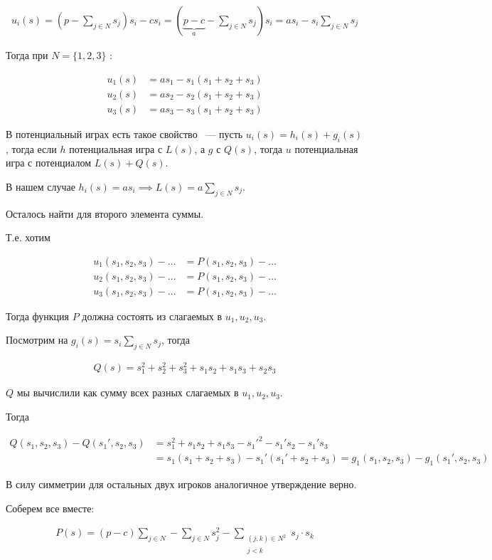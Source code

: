 
\begin{exmpl}
	\begin{align*}
		u_i(s) = (p - \sum_{j \in N}s_j) s_i - c s_i = (\underbrace{p - c}_{a} - \sum_{j \in N} s_j) s_i = a s_i - s_i \sum_{j \in N} s_j
	\end{align*}

	Тогда при $N = \{1, 2, 3\}$ :

	\begin{align*}
		u_1(s) &= as_1 - s_1(s_1 + s_2 + s_3) \\
		u_2(s) &= as_2 - s_2(s_1 + s_2 + s_3) \\
		u_3(s) &= as_3 - s_3(s_1 + s_2 + s_3)
	\end{align*}

	В потенциальный играх есть такое свойство ~--- пусть $u_i(s) = h_i(s) + g_i(s)$, тогда если  $h$ потенциальная игра с  $L(s)$, а  $g$ с  $Q(s)$, тогда  $u$ потенциальная игра с потенциалом  $L(s) + Q(s)$.

	В нашем случае $h_i(s) = a s_i \implies L(s) = a \sum_{j \in N} s_j$.

	Осталось найти для второго элемента суммы.

	Т.е. хотим 

	 \begin{align*}
		 u_1(s_1, s_2, s_3) - \dots &= P(s_1, s_2, s_3) - \dots \\
		 u_2(s_1, s_2, s_3) - \dots &= P(s_1, s_2, s_3) - \dots \\
		 u_3(s_1, s_2, s_3) - \dots &= P(s_1, s_2, s_3) - \dots
	\end{align*}

	Тогда функция $P$ должна состоять из слагаемых в  $u_1, u_2, u_3$.

	Посмотрим на $g_i(s) = s_i \sum_{j \in N} s_j$, тогда 

	 \begin{align*}
		Q(s) = s_1^2 + s_2^2 + s_3^2 + s_1s_2 + s_1s_3 + s_2s_3
	\end{align*}

	$Q$ мы вычислили как сумму всех разных слагаемых в  $u_1, u_2, u_3$.

	Тогда 

	\begin{align*}
	Q(s_1, s_2, s_3) - Q(s_1', s_2, s_3) &= s_1^2 + s_1s_2 + s_1s_3 - {s_1'}^2 - s_1's_2 - s_1's_3  \\
		&= s_1(s_1 + s_2 + s_3) - s_1'(s_1' + s_2 + s_3) = g_1(s_1, s_2, s_3) - g_1(s_1', s_2, s_3)
	\end{align*}

	В силу симметрии для остальных двух игроков аналогичное утверждение верно.

	Соберем все вместе:

	\begin{align*}
		P(s) = (p - c) \sum_{j \in N} - \sum_{j \in N} s_j^2 - \sum_{\substack{(j, k) \in N^2 \\ j < k}} s_j \cdot s_k
	\end{align*}

\end{exmpl}

